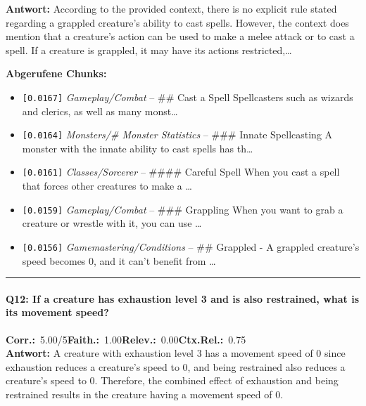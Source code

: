 \noindent\textbf{Antwort:} According to the provided context, there is no explicit rule stated regarding a grappled creature's ability to cast spells. However, the context does mention that a creature's action can be used to make a melee attack or to cast a spell. If a creature is grappled, it may have its actions restricted,\ldots

\noindent\textbf{Abgerufene Chunks:}
\begin{itemize}[noitemsep, topsep=2pt]
  \item[\textbf{\#1}] \texttt{[0.0167]} \textit{Gameplay/Combat} -- \#\# Cast a Spell  Spellcasters such as wizards and clerics, as well as many monst\ldots
  \item[\textbf{\#2}] \texttt{[0.0164]} \textit{Monsters/# Monster Statistics} -- \#\#\# Innate Spellcasting  A monster with the innate ability to cast spells has th\ldots
  \item[\textbf{\#3}] \texttt{[0.0161]} \textit{Classes/Sorcerer} -- \#\#\#\# Careful Spell  When you cast a spell that forces other creatures to make a \ldots
  \item[\textbf{\#4}] \texttt{[0.0159]} \textit{Gameplay/Combat} -- \#\#\# Grappling  When you want to grab a creature or wrestle with it, you can use \ldots
  \item[\textbf{\#5}] \texttt{[0.0156]} \textit{Gamemastering/Conditions} -- \#\# Grappled  - A grappled creature's speed becomes 0, and it can't benefit from \ldots
\end{itemize}
\vspace{4pt}
\hrule
\vspace{6pt}

\paragraph{Q12: If a creature has exhaustion level 3 and is also restrained, what is its movement speed?}
\noindent \textbf{Corr.:}~5.00/5\quad \textbf{Faith.:}~1.00\quad \textbf{Relev.:}~0.00\quad \textbf{Ctx.Rel.:}~0.75\\

\noindent\textbf{Antwort:} A creature with exhaustion level 3 has a movement speed of 0 since exhaustion reduces a creature's speed to 0, and being restrained also reduces a creature's speed to 0. Therefore, the combined effect of exhaustion and being restrained results in the creature having a movement speed of 0.

